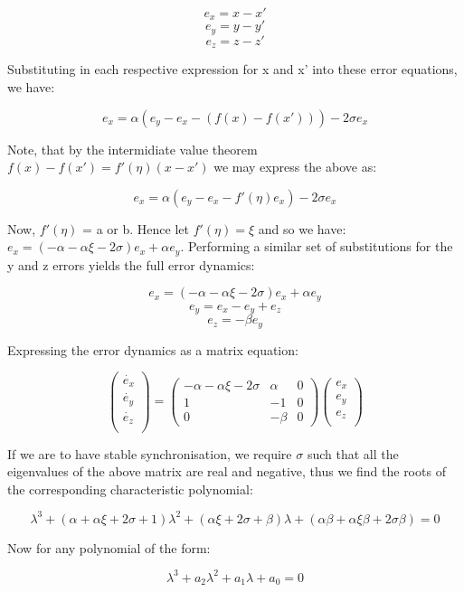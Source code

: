 \documentclass{article}
\begin{document}
$$e_{x} = x - x'$$
$$e_{y} = y - y'$$
$$e_{z} = z - z'$$

Substituting in each respective expression for x and x' into these error equations, we have:

$$e_{x} = \alpha(e_{y} - e_{x} - (f(x) - f(x'))) - 2\sigma e_{x}$$


Note, that by the intermidiate value theorem $f(x) - f(x') = f'(\eta)(x - x')$ we may express the above as:

$$e_{x} = \alpha(e_{y} - e_{x} - f'(\eta)e_{x}) - 2\sigma e_{x}$$

Now, $f'(\eta)$ = a or b. Hence let $f'(\eta) = \xi$ and so
we have: $e_{x} = (-\alpha - \alpha\xi - 2\sigma)e_{x} + \alpha e_{y}$. Performing a
similar set of substitutions for the y and z errors yields the full error dynamics:

$$e_{x} = (-\alpha - \alpha\xi - 2\sigma)e_{x} + \alpha e_{y}$$
$$e_{y} = e_{x} - e_{y} + e_{z}$$
$$e_{z} = -\beta e_{y}$$

Expressing the error dynamics as a matrix equation:


$$
\begin{pmatrix}
    \dot{e_{x}} \\
    \dot{e_{y}} \\
    \dot{e_{z}} \\
\end{pmatrix} =
\begin{pmatrix}
-\alpha - \alpha\xi - 2\sigma & \alpha & 0\\
1 & -1 & 0\\
0 & -\beta & 0
\end{pmatrix}
\begin{pmatrix}
    e_{x} \\
    e_{y} \\
    e_{z} \\
\end{pmatrix}
$$


If we are to have stable synchronisation, we require $\sigma$ such that all the eigenvalues of
the above matrix are real and negative, thus we find the roots of the corresponding characteristic
polynomial:

$$\lambda^3 + (\alpha + \alpha\xi + 2\sigma + 1)\lambda^2 + (\alpha\xi + 2\sigma + \beta)\lambda + (\alpha\beta + \alpha\xi\beta + 2\sigma\beta) = 0$$

Now for any polynomial of the form:

$$\lambda^3 + a_{2}\lambda^2 + a_{1}\lambda + a_{0} = 0$$
\end{document}
